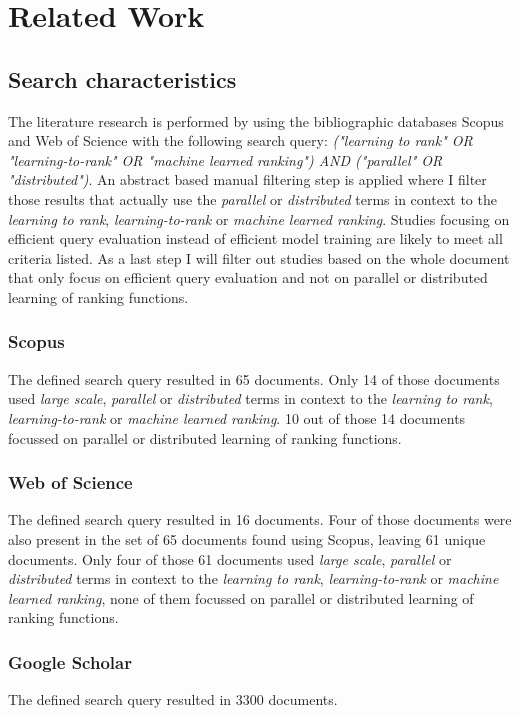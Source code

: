 \chapter{Related Work}
\section{Search characteristics}
The literature research is performed by using the bibliographic databases Scopus and Web of Science with the following search query: \emph{("learning to rank" OR "learning-to-rank" OR "machine learned ranking") AND ("parallel" OR "distributed")}. An abstract based manual filtering step is applied where I filter those results that actually use the \emph{parallel} or \emph{distributed} terms in context to the \emph{learning to rank}, \emph{learning-to-rank} or \emph{machine learned ranking}. Studies focusing on efficient query evaluation instead of efficient model training are likely to meet all criteria listed. As a last step I will filter out studies based on the whole document that only focus on efficient query evaluation and not on parallel or distributed learning of ranking functions.
\subsection{Scopus}
The defined search query resulted in 65 documents. Only 14 of those documents used \emph{large scale}, \emph{parallel} or \emph{distributed} terms in context to the \emph{learning to rank}, \emph{learning-to-rank} or \emph{machine learned ranking}. 10 out of those 14 documents focussed on parallel or distributed learning of ranking functions.
\subsection{Web of Science}
The defined search query resulted in 16 documents. Four of those documents were also present in the set of 65 documents found using Scopus, leaving 61 unique documents. Only four of those 61 documents used \emph{large scale}, \emph{parallel} or \emph{distributed} terms in context to the \emph{learning to rank}, \emph{learning-to-rank} or \emph{machine learned ranking}, none of them focussed on parallel or distributed learning of ranking functions.
\subsection{Google Scholar}
The defined search query resulted in 3300 documents.

